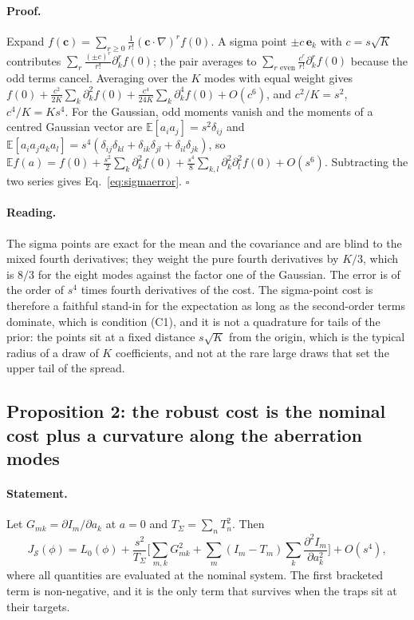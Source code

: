 \paragraph{Proof.} Expand $f(\mathbf c)=\sum_{r\ge0}\frac1{r!}(\mathbf c\!\cdot\!\nabla)^rf(0)$. A sigma point $\pm c\,\mathbf e_k$ with $c=s\sqrt K$ contributes $\sum_r\frac{(\pm c)^r}{r!}\partial_k^rf(0)$; the pair averages to $\sum_{r\text{ even}}\frac{c^r}{r!}\partial_k^rf(0)$ because the odd terms cancel. Averaging over the $K$ modes with equal weight gives
$f(0)+\frac{c^2}{2K}\sum_k\partial_k^2f(0)+\frac{c^4}{24K}\sum_k\partial_k^4f(0)+O(c^6)$, and $c^2/K=s^2$, $c^4/K=Ks^4$. For the Gaussian, odd moments vanish and the moments of a centred Gaussian vector are $\mathbb E[a_ia_j]=s^2\delta_{ij}$ and $\mathbb E[a_ia_ja_ka_l]=s^4(\delta_{ij}\delta_{kl}+\delta_{ik}\delta_{jl}+\delta_{il}\delta_{jk})$, so
$\mathbb Ef(a)=f(0)+\frac{s^2}2\sum_k\partial_k^2f(0)+\frac{s^4}8\sum_{k,l}\partial_k^2\partial_l^2f(0)+O(s^6)$. Subtracting the two series gives Eq.~\eqref{eq:sigmaerror}. \hfill$\square$

\paragraph{Reading.} The sigma points are exact for the mean and the covariance and are blind to the mixed fourth derivatives; they weight the pure fourth derivatives by $K/3$, which is $8/3$ for the eight modes against the factor one of the Gaussian. The error is of the order of $s^4$ times fourth derivatives of the cost. The
sigma-point cost is therefore a faithful stand-in for the expectation as long as the second-order terms dominate, which is condition (C1), and it is not a quadrature for tails of the prior: the points sit at a fixed distance $s\sqrt K$ from the origin, which is the typical radius of a draw of $K$ coefficients, and not at the rare large draws that set the upper tail of the spread.

\subsection{Proposition 2: the robust cost is the nominal cost plus a curvature along the aberration modes}

\paragraph{Statement.} Let $G_{mk}=\partial I_m/\partial a_k$ at $a=0$ and $T_{\Sigma}=\sum_nT_n^2$. Then
\begin{equation}
J_{\mathcal S}(\phi)=L_0(\phi)+\frac{s^2}{T_\Sigma}\Big[\sum_{m,k}G_{mk}^2+\sum_m(I_m-T_m)\sum_k\frac{\partial^2I_m}{\partial a_k^2}\Big]+O(s^4),\label{eq:curvature}
\end{equation}
where all quantities are evaluated at the nominal system. The first bracketed term is non-negative, and it is the only term that survives when the traps sit at their targets.

